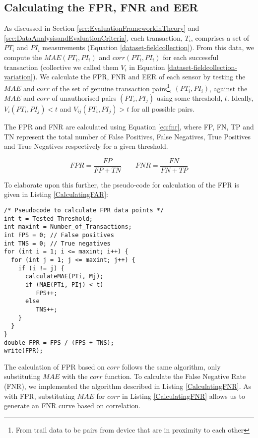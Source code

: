 \documentclass{article}
\begin{document}
\subsection{Calculating the FPR, FNR and EER}
As discussed in Section \ref{sec:EvaluationFrameworkinTheory} and
 \ref{sec:DataAnalysisandEvaluationCriteria}, each transaction, $T_i$, comprises a set of $PT_i$ and $PI_i$ measurements (Equation \ref{dataset-fieldcollection}).  From this data, we compute the $MAE(PT_i, PI_i)$ and $corr(PT_i, PI_i)$ for each successful transaction (collective we called them $V_i$ in Equation \ref{dataset-fieldcollection-variation}).   We calculate the FPR, FNR and EER of each sensor by testing the $MAE$ and $corr$ of the set of genuine transaction pairs\footnote{From trail data to be pairs from device that are in proximity to each other}, $(PT_i, PI_i)$, against the $MAE$ and $corr$ of unauthorised pairs $(PT_i, PI_j)$ using some threshold, $t$.  Ideally, $V_i(PT_i, PI_j) < t$ and $V_{ij}(PT_i, PI_j) > t$ for all possible pairs.  
 
The FPR and FNR are calculated using Equation \ref{eq:fnr}, where FP, FN, TP and TN represent the total number of False Positives, False Negatives, True Positives and True Negatives respectively for a given threshold.

\begin{equation}
FPR = \frac{FP}{FP + TN}
\qquad
FNR = \frac{FN}{FN + TP}
\label{eq:fnr}
\end{equation}

 
To elaborate upon this further, the pseudo-code for calculation of the FPR is given in Listing \ref{CalculatingFAR}:

\begin{lstlisting}[style=customc, caption={Calculating False Positive Rate},label=CalculatingFAR]
/* Pseudocode to calculate FPR data points */
int t = Tested_Threshold;
int maxint = Number_of_Transactions;
int FPS = 0; // False positives
int TNS = 0; // True negatives
for (int i = 1; i <= maxint; i++) {
  for (int j = 1; j <= maxint; j++) {
    if (i != j) {
      calculateMAE(PTi, Mj);
      if (MAE(PTi, PIj) < t)
         FPS++;
      else
         TNS++;
    }        
  }
}
double FPR = FPS / (FPS + TNS);
write(FPR);
\end{lstlisting}

The calculation of FPR based on $corr$ follows the same algorithm, only substituting $MAE$ with the $corr$ function.  To calculate the False Negative Rate (FNR), we implemented the algorithm described in Listing \ref{CalculatingFNR}.  As with FPR, substituting $MAE$ for $corr$ in Listing \ref{CalculatingFNR} allows us to generate an FNR curve based on correlation. 
\end{document}

